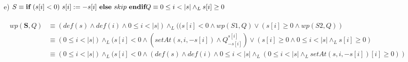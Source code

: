 \documentclass{article}
\begin{document}
{{\begin{itemize}
    \textbf{Luego veo la wp de la consigna}
    \setcounter{equation}{0}
    \begin{align}
        wp(\textbf{S},Q)&\equiv (def(i)\land_L(i>1 \land wp(S1,Q))\lor(i\leq 1 \land wp(S2,Q)))\\
        &\equiv ((i>1 \land ((1\leq i<|s|) \land_L (\forall j :Z)((1 \leq j < |s| \land i\neq j)\to_L s[j]=s[j-1]))\lor\\\nonumber &(i\leq 1 \land (def(S)\land def(i) \land 0\leq i<|s| \land Q^{s[i]}_{setAt(s,i,0)}))))\\
        &\equiv ((1<i<|s|) \land_L (\forall j :Z)((1 \leq j < |s| \land i\neq j)\to_L s[j]=s[j-1]))\lor\\\nonumber &(i =0 \land Q^{s[i]}_{setAt(s,i,0)})\land (i =1 \land Q^{s[i]}_{setAt(s,i,0)}))\\
        &\equiv ((1<i<|s|) \land_L (\forall j :Z)((1 \leq j < |s| \land i\neq j)\to_L s[j]=s[j-1]))\lor\\\nonumber 
        &(i =0 \land (\forall j :Z)(1 \leq j < |s| \to_L setAt(s,i,0)[j]=setAt(s,i,0)[j-1]))\land\\\nonumber 
        & (i =1 \land (\forall j :Z)(1 \leq j < |s| \to_L setAt(s,i,0)[j]=setAt(s,i,0)[j-1]))\\
        &\equiv ((1<i<|s|) \land_L (\forall j :Z)((1 \leq j < |s| \land i\neq j)\to_L s[j]=s[j-1]))\lor\\\nonumber 
        &(i =0 \land (\forall j :Z)(1 \leq j < |s| \to_L(s[j]=s[j-1]))\land\\\nonumber 
        & (i =1 \land (\forall j :Z)(1 \leq j < |s| \land i\neq j \to_L s[j]=s[j-1]))
    \end{align}
    \item [e) ]$S\equiv \textbf{if}\ (s[i]<0)\ s[i]:=-s[i]\ \textbf{else}\ skip\ \textbf{endif}\\
    Q \equiv 0\leq i<|s| \land_L s[i]\geq0$\\\\
    \setcounter{equation}{0}
    \begin{align}
        wp(\textbf{S},Q)&\equiv (def(s)\land def(i)\land 0\leq i<|s|)\land_L ((s[i]<0 
        \land wp(S1,Q)\lor(s[i]\geq0 \land wp(S2,Q))\\
        &\equiv (0\leq i<|s|)\land_L (s[i]<0 \land (setAt(s,i,-s[i])\land Q^{s[i]}_{-s[i]})\lor(s[i]\geq0 \land 0\leq i<|s| \land_L s[i]\geq0)\\
        &\equiv (0\leq i<|s|)\land_L (s[i]<0 \land (def(s)\land def(i)\land 0\leq i<|s|\land_L (0\leq i<|s| \land_L setAt(s,i,-s[i])[i]\geq0))\\

\end{align}
\end{itemize}}}
\end{document}
